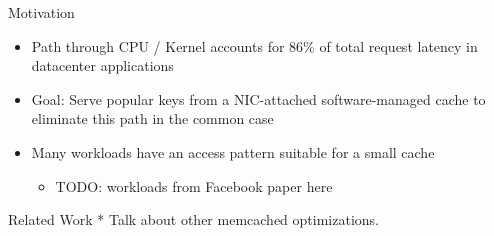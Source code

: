 \begin{block}{Motivation}
    \begin{itemize}
        \item Path through CPU / Kernel accounts for 86\% of total request latency in datacenter applications
        \item Goal: Serve popular keys from a NIC-attached software-managed cache to eliminate this path in the common case
        \item Many workloads have an access pattern suitable for a small cache
            \begin{itemize}
                \item TODO: workloads from Facebook paper here
            \end{itemize}

    \end{itemize}    

\end{block}

\vspace{1ex}

\begin{block}{Related Work}
* Talk about other memcached optimizations.


\end{block}
